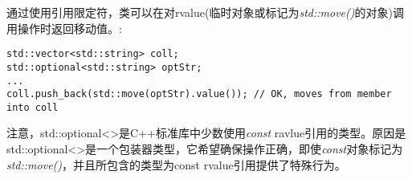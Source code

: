 通过使用引用限定符，类可以在对rvalue(临时对象或标记为\textit{std::move()}的对象)调用操作时返回移动值。:\par

\begin{lstlisting}[caption={}]
std::vector<std::string> coll;
std::optional<std::string> optStr;
...
coll.push_back(std::move(optStr).value()); // OK, moves from member into coll
\end{lstlisting}

注意，std::optional<>是C++标准库中少数使用\textit{const} ravlue引用的类型。原因是std::optional<>是一个包装器类型，它希望确保操作正确，即使\textit{const}对象标记为\textit{std::move()}，并且所包含的类型为const rvalue引用提供了特殊行为。\par

















